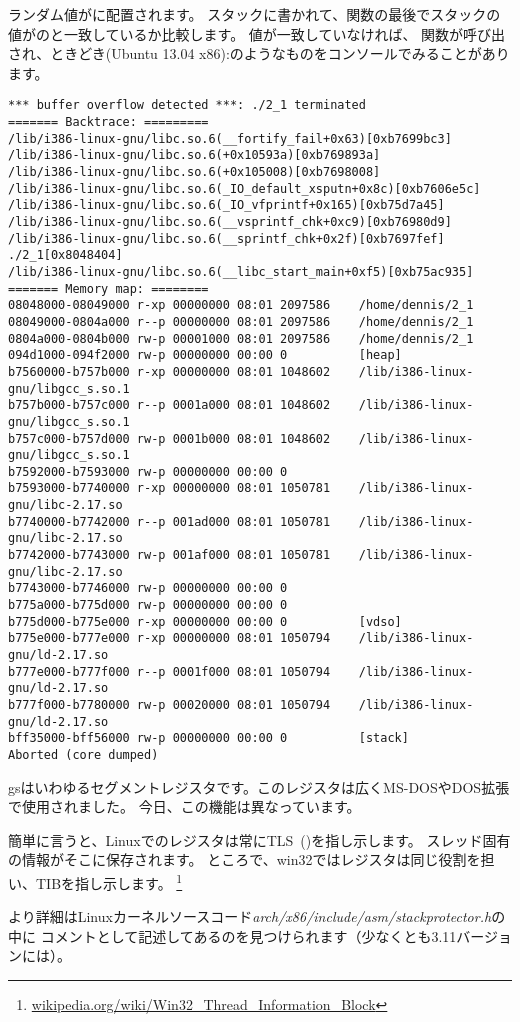 ランダム値がに配置されます。
スタックに書かれて、関数の最後でスタックの値がのと一致しているか比較します。
値が一致していなければ、
関数が呼び出され、ときどき(Ubuntu 13.04 x86):のようなものをコンソールでみることがあります。

\begin{lstlisting}
*** buffer overflow detected ***: ./2_1 terminated
======= Backtrace: =========
/lib/i386-linux-gnu/libc.so.6(__fortify_fail+0x63)[0xb7699bc3]
/lib/i386-linux-gnu/libc.so.6(+0x10593a)[0xb769893a]
/lib/i386-linux-gnu/libc.so.6(+0x105008)[0xb7698008]
/lib/i386-linux-gnu/libc.so.6(_IO_default_xsputn+0x8c)[0xb7606e5c]
/lib/i386-linux-gnu/libc.so.6(_IO_vfprintf+0x165)[0xb75d7a45]
/lib/i386-linux-gnu/libc.so.6(__vsprintf_chk+0xc9)[0xb76980d9]
/lib/i386-linux-gnu/libc.so.6(__sprintf_chk+0x2f)[0xb7697fef]
./2_1[0x8048404]
/lib/i386-linux-gnu/libc.so.6(__libc_start_main+0xf5)[0xb75ac935]
======= Memory map: ========
08048000-08049000 r-xp 00000000 08:01 2097586    /home/dennis/2_1
08049000-0804a000 r--p 00000000 08:01 2097586    /home/dennis/2_1
0804a000-0804b000 rw-p 00001000 08:01 2097586    /home/dennis/2_1
094d1000-094f2000 rw-p 00000000 00:00 0          [heap]
b7560000-b757b000 r-xp 00000000 08:01 1048602    /lib/i386-linux-gnu/libgcc_s.so.1
b757b000-b757c000 r--p 0001a000 08:01 1048602    /lib/i386-linux-gnu/libgcc_s.so.1
b757c000-b757d000 rw-p 0001b000 08:01 1048602    /lib/i386-linux-gnu/libgcc_s.so.1
b7592000-b7593000 rw-p 00000000 00:00 0
b7593000-b7740000 r-xp 00000000 08:01 1050781    /lib/i386-linux-gnu/libc-2.17.so
b7740000-b7742000 r--p 001ad000 08:01 1050781    /lib/i386-linux-gnu/libc-2.17.so
b7742000-b7743000 rw-p 001af000 08:01 1050781    /lib/i386-linux-gnu/libc-2.17.so
b7743000-b7746000 rw-p 00000000 00:00 0
b775a000-b775d000 rw-p 00000000 00:00 0
b775d000-b775e000 r-xp 00000000 00:00 0          [vdso]
b775e000-b777e000 r-xp 00000000 08:01 1050794    /lib/i386-linux-gnu/ld-2.17.so
b777e000-b777f000 r--p 0001f000 08:01 1050794    /lib/i386-linux-gnu/ld-2.17.so
b777f000-b7780000 rw-p 00020000 08:01 1050794    /lib/i386-linux-gnu/ld-2.17.so
bff35000-bff56000 rw-p 00000000 00:00 0          [stack]
Aborted (core dumped)
\end{lstlisting}

gsはいわゆるセグメントレジスタです。このレジスタは広くMS-DOSやDOS拡張で使用されました。
今日、この機能は異なっています。

簡単に言うと、Linuxでのレジスタは常に\ac{TLS}~()を指し示します。
スレッド固有の情報がそこに保存されます。
ところで、win32ではレジスタは同じ役割を担い、\ac{TIB}を指し示します。
\footnote{\href{https://en.wikipedia.org/wiki/Win32_Thread_Information_Block}{wikipedia.org/wiki/Win32\_Thread\_Information\_Block}}

より詳細はLinuxカーネルソースコード\emph{arch/x86/include/asm/stackprotector.h}の中に
コメントとして記述してあるのを見つけられます（少なくとも3.11バージョンには）。


